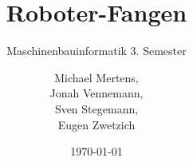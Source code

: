 \documentclass[pagesize=auto,titlepage=true,11pt,a4paper]{scrartcl}
\begin{document}
	\subject{Dokumentation}
	\title{Roboter-Fangen}
	\subtitle{Maschinenbauinformatik 3. Semester}
	\author{Michael Mertens, \\Jonah Vennemann, \\Sven Stegemann, \\Eugen Zwetzich}
	\date{\today}
	\maketitle
	\newpage
	\setcounter{page}{1}
	\tableofcontents
	\newpage
	\listoffigures
	\lstlistoflistings
	\newpage
	
	
	
	
	
		
	
	
	
	
	
	
	
	
\end{document}
